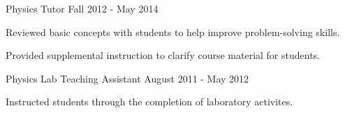 \begin{cventries}
 \cventry
    {Physics Tutor}
    {}
    {}
    {Fall 2012 - May 2014}
    {\begin{cvitems}
        \item Reviewed basic concepts with students to help improve problem-solving skills.
        \item Provided supplemental instruction to clarify course material for students.
     \end{cvitems}
    }

 \cventry
    {Physics Lab Teaching Assistant}
    {}
    {}
    {August 2011 - May 2012}
    {\begin{cvitems}
        \item Instructed students through the completion of laboratory activites.
     \end{cvitems}
    }


\end{cventries}
